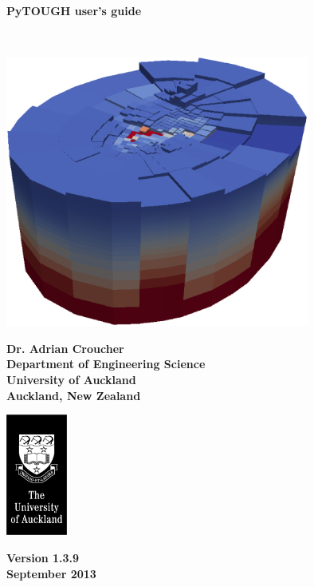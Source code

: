 \begin{titlepage}

\begin{center}

\bigskip\

\textbf{\Huge{PyTOUGH user's guide}}

\bigskip\

\includegraphics[width=0.75\textwidth]{coverpic}

\bigskip

\textbf{\large{Dr. Adrian Croucher\\
Department of Engineering Science\\
University of Auckland\\
Auckland, New Zealand}}

\bigskip
\bigskip
\bigskip

\includegraphics[height=4cm]{UoA_logo}

\bigskip
\bigskip
\bigskip
\bigskip

\textbf{\large{Version 1.3.9\\September 2013}}

\end{center}
\end{titlepage}

